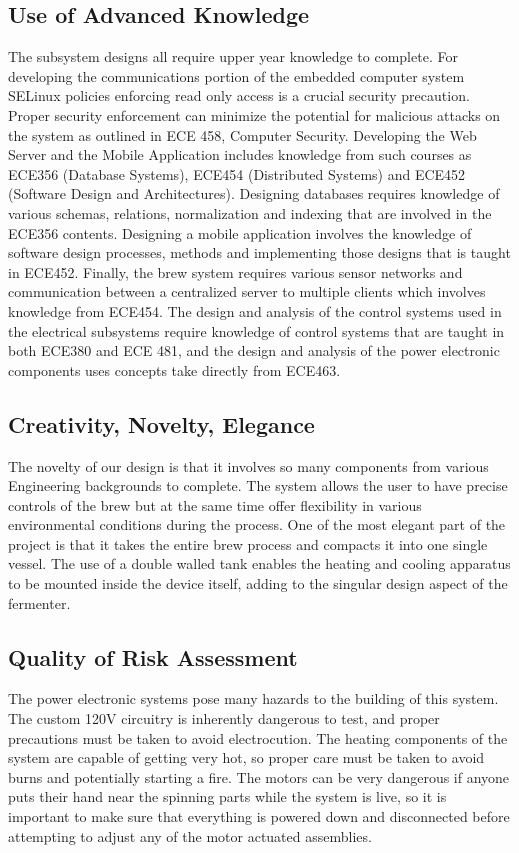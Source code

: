 \documentclass{article}
\begin{document}
\subsection{Use of Advanced Knowledge}
The subsystem designs all require upper year knowledge to complete. For developing the communications portion of the embedded computer system SELinux policies enforcing read only access is a crucial security precaution.  Proper security enforcement can minimize the potential for malicious attacks on the system as outlined in ECE 458, Computer Security.  Developing the Web Server and the Mobile Application includes knowledge from such courses as ECE356 (Database Systems), ECE454 (Distributed Systems) and ECE452 (Software Design and Architectures). Designing databases requires knowledge of various schemas, relations, normalization and indexing that are involved in the ECE356 contents. Designing a mobile application involves the knowledge of software design processes, methods and implementing those designs that is taught in ECE452. Finally, the brew system requires various sensor networks and communication between a centralized server to multiple clients which involves knowledge from ECE454. The design and analysis of the control systems used in the electrical subsystems require knowledge of control systems that are taught in both ECE380 and ECE 481, and the design and analysis of the power electronic components uses concepts take directly from ECE463.
\subsection{Creativity, Novelty, Elegance}
The novelty of our design is that it involves so many components from various Engineering backgrounds to complete. The system allows the user to have precise controls of the brew but at the same time offer flexibility in various environmental conditions during the process. One of the most elegant part of the project is that it takes the entire brew process and compacts it into one single vessel. The use of a double walled tank enables the heating and cooling apparatus to be mounted inside the device itself, adding to the singular design aspect of the fermenter.

\subsection{Quality of Risk Assessment}
The power electronic systems pose many hazards to the building of this system. The custom 120V circuitry is inherently dangerous to test, and proper precautions must be taken to avoid electrocution. The heating components of the system are capable of getting very hot, so proper care must be taken to avoid burns and potentially starting a fire. The motors can be very dangerous if anyone puts their hand near the spinning parts while the system is live, so it is important to make sure that everything is powered down and disconnected before attempting to adjust any of the motor actuated assemblies.
\end{document}
